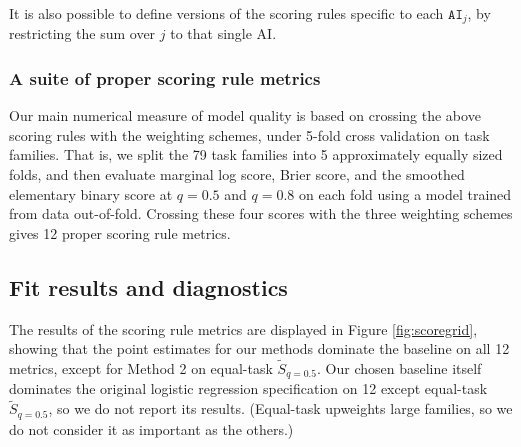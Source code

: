 \documentclass{article}
\theoremstyle{definition}
\newcommand{\AI}{\texttt{AI}}
\begin{document}
It is also possible to define versions of the scoring rules specific to each $\AI_j$, by restricting the sum over $j$ to that single AI. 


\subsubsection{A suite of proper scoring rule metrics}

Our main numerical measure of model quality is based on crossing the above scoring rules with the weighting schemes, under 5-fold cross validation on task families. That is, we split the 79 task families into 5 approximately equally sized folds, and then evaluate marginal log score, Brier score, and the smoothed elementary binary score at $q = 0.5$ and $q = 0.8$ on each fold using a model trained from data out-of-fold. Crossing these four scores with the three weighting schemes gives 12 proper scoring rule metrics. 




\subsection{Fit results and diagnostics}\label{sec:fit-results}


The results of the scoring rule metrics are displayed in Figure \ref{fig:scoregrid}, showing that the point estimates for our methods dominate the baseline on all 12 metrics, except for Method 2 on equal-task $\tilde S_{q = 0.5}$. Our chosen baseline itself dominates the original logistic regression specification on 12 except equal-task $\tilde S_{q = 0.5}$, so we do not report its results. (Equal-task upweights large families, so we do not consider it as important as the others.)
\end{document}
